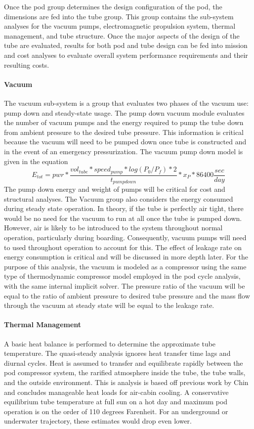 	Once the pod group determines the design configuration of the pod, the
	dimensions are fed into the tube group. This group contains the sub-system
	analyses for the vacuum pumps, electromagnetic propulsion system, thermal
	management, and tube structure. Once the major aspects of the design of the
	tube are evaluated, results for both pod and tube design can be fed into
	mission and cost analyses to evaluate overall system performance
	requirements and their resulting costs.

\paragraph{Vacuum}
	The vacuum sub-system is a group that evaluates two phases of the vacuum
	use: pump down and steady-state usage. The pump down vacuum module
	evaluates the number of vacuum pumps and the energy required to pump the
	tube down from ambient pressure to the desired tube pressure.
	This information is critical because the vacuum will need to be pumped down
	once tube is constructed and in the event of an emergency pressurization.
	The vacuum pump down model is given in the equation
	\begin{equation}
		\label{eq:vacuum}
		E_{tot} = pwr * \frac{vol_{tube}*speed_{pump}*log(P_{0}/P_{f})*2}{t_{pumpdown}}* x_{P} * 86400 \frac{sec}{day}
	\end{equation}
	The pump down energy and weight of pumps will be critical for cost and structural analyses.
	The Vacuum group also considers the energy consumed during steady state operation.
	In theory, if the tube is perfectly air tight, there would be no need for
	the vacuum to run at all once the tube is pumped down. However, air is likely to be introduced
	to the system throughout normal operation, particularly during boarding. Consequently,
	vacuum pumps will need to used throughout operation to account for this.
	The effect of leakage rate on energy consumption is critical and will be
	discussed in more depth later. For the purpose of this analysis, the vacuum
	is modeled as a compressor using the same type of thermodynamic compressor
	model employed in the pod cycle analysis,
	with the same internal implicit solver.
	The pressure ratio of the vacuum will be equal to the ratio of ambient
	pressure to desired tube pressure and the mass flow through the vacuum at
	steady state will be equal to the leakage rate.
\paragraph{Thermal Management}
	A basic heat balance is performed to determine the approximate tube temperature.
	The quasi-steady analysis ignores heat transfer time lags and diurnal cycles.
	Heat is assumed to transfer and equilibrate rapidly between the pod compressor system,
	the rarified atmosphere inside the tube, the tube walls, and the outside environment.
	This is analysis is based off previous work by Chin\cite{Chin} and concludes
	manageable heat loads for air-cabin cooling. A conservative equilibrium
	tube temperature at full sun on a hot day and maximum pod operation is on
	the order of 110 degrees Farenheit.
	For an underground or underwater trajectory, these estimates would drop even lower.
